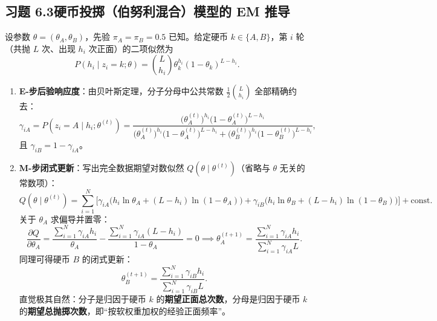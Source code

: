 \subsection*{习题 6.3\quad 硬币投掷（伯努利混合）模型的 EM 推导}
设参数 $\theta = (\theta_A, \theta_B)$，先验 $\pi_A = \pi_B = 0.5$ 已知。给定硬币 $k \in \{A, B\}$，第 $i$ 轮（共抛 $L$ 次、出现 $h_i$ 次正面）的二项似然为
\[
  P(h_i \mid z_i = k; \theta) = \binom{L}{h_i}\theta_k^{h_i}(1 - \theta_k)^{L - h_i}.
\]
\begin{enumerate}[label=(\arabic*), leftmargin=1.8em]
  \item \textbf{E-步后验响应度}：由贝叶斯定理，分子分母中公共常数 $\frac{1}{2}\binom{L}{h_i}$ 全部精确约去：
  \[
    \gamma_{iA} = P\!\left(z_i = A \mid h_i; \theta^{(t)}\right)
    = \frac{\big(\theta_A^{(t)}\big)^{h_i}\big(1 - \theta_A^{(t)}\big)^{L - h_i}}
           {\big(\theta_A^{(t)}\big)^{h_i}\big(1 - \theta_A^{(t)}\big)^{L - h_i} + \big(\theta_B^{(t)}\big)^{h_i}\big(1 - \theta_B^{(t)}\big)^{L - h_i}},
  \]
  且 $\gamma_{iB} = 1 - \gamma_{iA}$。

  \item \textbf{M-步闭式更新}：写出完全数据期望对数似然 $Q(\theta \mid \theta^{(t)})$（省略与 $\theta$ 无关的常数项）：
  \[
    Q(\theta \mid \theta^{(t)}) = \sum_{i=1}^N \Big[
      \gamma_{iA}\big(h_i \ln\theta_A + (L - h_i)\ln(1 - \theta_A)\big)
      + \gamma_{iB}\big(h_i \ln\theta_B + (L - h_i)\ln(1 - \theta_B)\big)
    \Big] + \text{const}.
  \]
  关于 $\theta_A$ 求偏导并置零：
  \[
    \frac{\partial Q}{\partial \theta_A}
    = \frac{\sum_{i=1}^N \gamma_{iA} h_i}{\theta_A} - \frac{\sum_{i=1}^N \gamma_{iA}(L - h_i)}{1 - \theta_A} = 0
    \implies \theta_A^{(t+1)} = \frac{\sum_{i=1}^N \gamma_{iA} h_i}{\sum_{i=1}^N \gamma_{iA} L}.
  \]
  同理可得硬币 $B$ 的闭式更新：
  \[
    \theta_B^{(t+1)} = \frac{\sum_{i=1}^N \gamma_{iB} h_i}{\sum_{i=1}^N \gamma_{iB} L}.
  \]
  直觉极其自然：分子是归因于硬币 $k$ 的\textbf{期望正面总次数}，分母是归因于硬币 $k$ 的\textbf{期望总抛掷次数}，即“按软权重加权的经验正面频率”。
\end{enumerate}

